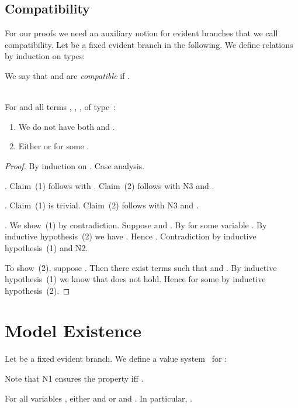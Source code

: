 \subsection{Compatibility}\label{sec:compat}

For our proofs we need an auxiliary notion for evident
branches that we call compatibility.  Let  be a
fixed evident branch in the following.  We define
relations
 by
induction on types:

We say that  and  are \emph{compatible} if
.

\begin{lem}[Compatibility]
  \label{lem-compatibility}~\\
  For  and all terms , , ,
   of type~:
  \begin{enumerate}[\em(1)]
  \item We do not have both  and .
  \item Either 
    or  for some
    .
  \end{enumerate}
\end{lem}

\begin{proof}
  By induction on .  Case analysis.

  .  Claim~(1) follows with \EBE.
  Claim~(2) follows with N3 and \EMat.

  .  Claim~(1) is trivial.  Claim~(2)
  follows with N3 and \EDec.

  .  We show~(1) by contradiction.
  Suppose  and .
  By \EFE  for some
  variable .  By inductive hypothesis~(2) we have
  .  Hence .
  Contradiction by inductive hypothesis~(1) and N2.

  To show~(2), suppose .  Then there exist terms such that
   and .  By inductive hypothesis~(1) we know
  that  does not hold.  Hence
   for some 
  by inductive hypothesis~(2).
\end{proof}



\section{Model Existence}
\label{sec:model-existence}

Let  be a fixed evident branch.  We define a value
system~ for :

Note that N1 ensures the property  iff
.

\begin{prop}
  \label{prop-mod-ex-o}
  For all variables , either  and 
  or  and .
  In particular, .
\end{prop}

